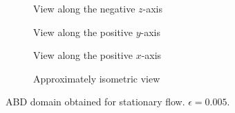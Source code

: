 \begin{figure}[htpb]
    \centering
    \begin{subfigure}[b]{0.475\textwidth}
        \centering
        \caption[]{{\small View along the negative $z$-axis}}
        \label{fig:u0_dom_err_bs32}
    \end{subfigure}
    \begin{subfigure}[b]{0.475\textwidth}
        \centering
        \caption[]{{\small View along the positive $y$-axis}}
        \label{fig:u0_dom_err_bs54}
    \end{subfigure}

    \begin{subfigure}[b]{0.475\textwidth}
        \centering
        \caption[]{{\small View along the positive $x$-axis}}
        \label{fig:u0_dom_err_dp54}
    \end{subfigure}
    \begin{subfigure}[b]{0.475\textwidth}
        \centering
        \caption[]{{\small Approximately isometric view}}
        \label{fig:u0_dom_err_dp87}
    \end{subfigure}
    \caption[Aviici is love, Aviici is life]{ABD domain obtained for stationary flow. $\epsilon=0.005$.}
    \label{fig:u0_dom_errs}
\end{figure}

